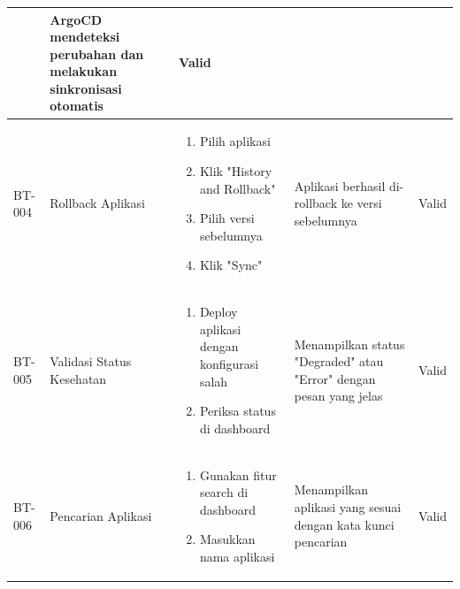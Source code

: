 \begin{table}[h]
\begin{adjustbox}{width=\textwidth}
\begin{tabular}{|p{0.8cm}|p{2.2cm}|p{4cm}|p{3.5cm}|p{1.2cm}|}
\begin{enumerate}[leftmargin=*,noitemsep,topsep=0pt,label=\arabic*.,widest=99]
                                                      \end{enumerate} & ArgoCD mendeteksi perubahan dan melakukan sinkronisasi otomatis    & Valid                                                             \\ \hline
      BT-004            & Rollback Aplikasi         & \begin{enumerate}[leftmargin=*,noitemsep,topsep=0pt,label=\arabic*.,widest=99]
                                                        \item Pilih aplikasi
                                                        \item Klik "History and Rollback"
                                                        \item Pilih versi sebelumnya
                                                        \item Klik "Sync"
                                                      \end{enumerate} & Aplikasi berhasil di-rollback ke versi sebelumnya                  & Valid                                                             \\ \hline
      BT-005            & Validasi Status Kesehatan & \begin{enumerate}[leftmargin=*,noitemsep,topsep=0pt,label=\arabic*.,widest=99]
                                                        \item Deploy aplikasi dengan konfigurasi salah
                                                        \item Periksa status di dashboard
                                                      \end{enumerate} & Menampilkan status "Degraded" atau "Error" dengan pesan yang jelas & Valid                                                             \\ \hline
      BT-006            & Pencarian Aplikasi        & \begin{enumerate}[leftmargin=*,noitemsep,topsep=0pt,label=\arabic*.,widest=99]
                                                        \item Gunakan fitur search di dashboard
                                                        \item Masukkan nama aplikasi
                                                      \end{enumerate} & Menampilkan aplikasi yang sesuai dengan kata kunci pencarian       & Valid                                                             \\ \hline

\end{tabular}
\end{adjustbox}
\end{table}
